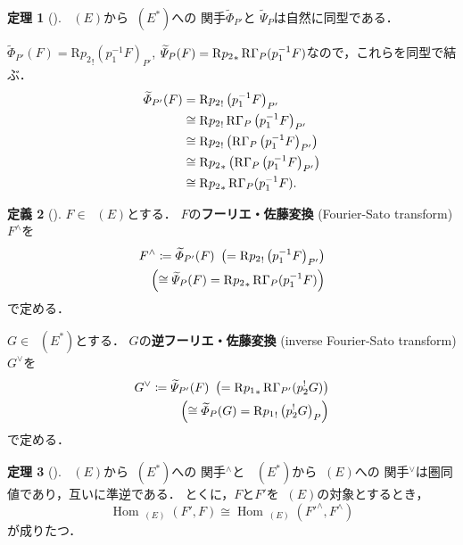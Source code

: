 \documentclass[uplatex,dvipdfmx,a4paper,10pt,draft]{jsarticle}
\makeatletter
\theoremstyle{definition}
\newcommand{\rr}{\mathbf{R}}
\newcommand{\Hom}{\mathop{\mathrm{Hom}}\nolimits} %
\renewenvironment{proof}[1][\proofname]{\par
  \pushQED{\qed}%
  \normalfont \topsep6\p@\@plus6\p@\relax
  \trivlist
  \item[\hskip\labelsep
         \bfseries
    {#1}]\ignorespaces
}{%
  \popQED\endtrivlist\@endpefalse
}
\renewcommand{\proofname}{証明.}
\numberwithin{equation}{section}
\newcommand{\RG}{\mathop{\mathrm{R}\hspace{-0pt}\Gamma}\nolimits}
\newcommand{\Rder}{\mathrm{R}}
\theoremstyle{mystyle}
\newtheorem{mythm}{定理}[section]
\newtheorem{mydfn}[mythm]{定義}
\newenvironment{thm}{\begin{thmbox}\begin{mythm}}{\end{mythm}\end{thmbox}}
\newenvironment{dfn}{\begin{dfnbox}\begin{mydfn}}{\end{mydfn}\end{dfnbox}}
\newcommand{\Dlcon}{\mathop{\mathsf{D}^{+}_{\rr_{>0}}}\nolimits}
\makeatother
\begin{document}
\begin{thm}[{\cite[Theorem 3.7.7]{KS90}}]
    \(\Dlcon(E)\)から\(\Dlcon(E^\ast)\)への
    関手\(\widetilde{\varPhi}_{P'}\)と
    \(\widetilde{\varPsi}_{P}\)は自然に同型である．
\end{thm}
\begin{proof}
    \(
        \widetilde{\varPhi}_{P'}(F)
        =\Rder{p_2}_!\left(p_1^{-1}F\right)_{P'}
    \), \(
        \widetilde{\varPsi}_{P}(F)
        =\Rder{p_2}_{\ast}\RG_{P}(p_1^{-1}F)
    \)なので，これらを同型で結ぶ．
    \begin{align*}
        \widetilde{\varPhi}_{P'}(F)
        &=\Rder{p_2}_!\left(p_1^{-1}F\right)_{P'}\\
        &\cong\Rder{p_2}_!\RG_{P}\left(p_1^{-1}F\right)_{P'}\\
        &\cong\Rder{p_2}_!\left(\RG_{P}\left(p_1^{-1}F\right)_{P'}\right)\\
        &\cong\Rder{p_2}_{\ast}\left(
            \RG_{P}\left(p_1^{-1}F\right)_{P'}
        \right)\\
        &\cong\Rder{p_2}_{\ast}\RG_{P}(p_1^{-1}F).
    \end{align*}
\end{proof}
\begin{dfn}[{\cite[Definition 3.7.8]{KS90}}]
    \(F\in\Dlcon(E)\)とする．
    \(F\)の\textbf{フーリエ・佐藤変換} (Fourier-Sato transform) 
    \(F^{\wedge}\)を
    \begin{align*}
        F^{\wedge}
        \coloneqq \widetilde{\varPhi}_{P'}(F)\
        \left(=\Rder{p_2}_!\left(p_1^{-1}F\right)_{P'}\right)\\
        \left(
            \cong\widetilde{\varPsi}_{P}(F)
            =\Rder{p_2}_{\ast}\RG_{P}(p_1^{-1}F)
        \right)
    \end{align*}
    で定める．

    \(G\in\Dlcon(E^\ast)\)とする．
    \(G\)の\textbf{逆フーリエ・佐藤変換} (inverse 
    Fourier-Sato transform) \(G^{\vee}\)を
    \begin{align*}
        G^{\vee}
        \coloneqq \widetilde{\varPsi}_{P'}(F)\
        \left(=\Rder{p_1}_{\ast}\RG_{P'}(p_2^{!}G)\right)\\
        \left(
            \cong \widetilde{\varPhi}_{P}(G)
            =\Rder{p_1}_!\left(p_2^{!}G\right)_{P}
        \right)
    \end{align*}
    で定める．
\end{dfn}
\begin{thm}[{\cite[Theorem 3.7.9]{KS90}}]
    \(\Dlcon(E)\)から\(\Dlcon(E^\ast)\)への
    関手\({}^{\wedge}\)と
    \(\Dlcon(E^\ast)\)から\(\Dlcon(E)\)への
    関手\({}^{\vee}\)は圏同値であり，互いに準逆である．
    とくに，\(F\)と\(F'\)を\(\Dlcon(E)\)の対象とするとき，
    \[
        \Hom_{\Dlcon(E)}(F',F)\cong
        \Hom_{\Dlcon(E)}(F'^{\wedge},F^{\wedge})
    \]
    が成りたつ．
\end{thm}
\end{document}
